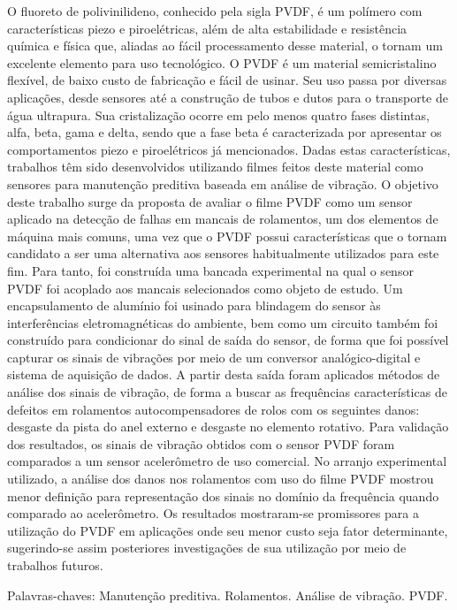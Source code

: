 \documentclass[
	12pt,				
	oneside,			
	a4paper,			
	english,			
	brazil,			
	]{abntex2ppgsi}
\begin{document}
\begin{resumo}
O fluoreto de polivinilideno, conhecido pela sigla PVDF, é um polímero com características piezo e piroelétricas, além de alta estabilidade e resistência química e física que, aliadas ao fácil processamento desse material, o tornam um excelente elemento para uso tecnológico. O PVDF é um material semicristalino flexível, de baixo custo de fabricação e fácil de usinar. Seu uso passa por diversas aplicações, desde sensores até a construção de tubos e dutos para o transporte de água ultrapura. Sua cristalização ocorre em pelo menos quatro fases distintas, alfa, beta, gama e delta, sendo que a fase beta é caracterizada por apresentar os comportamentos piezo e piroelétricos já mencionados. Dadas estas características, trabalhos têm sido desenvolvidos utilizando filmes feitos deste material como sensores para manutenção preditiva baseada em análise de vibração. O objetivo deste trabalho surge da proposta de avaliar o filme PVDF como um sensor aplicado na detecção de falhas em mancais de rolamentos, um dos elementos de máquina mais comuns, uma vez que o PVDF possui características que o tornam candidato a ser uma alternativa aos sensores habitualmente utilizados para este fim. Para tanto, foi construída uma bancada experimental na qual o sensor PVDF foi acoplado aos mancais selecionados como objeto de estudo. Um encapsulamento de alumínio foi usinado para blindagem do sensor às interferências eletromagnéticas do ambiente, bem como um circuito também foi construído para condicionar do sinal de saída do sensor, de forma que foi possível capturar os sinais de vibrações por meio de um conversor analógico-digital e sistema de aquisição de dados. A partir desta saída foram aplicados métodos de análise dos sinais de vibração, de forma a buscar as frequências características de defeitos em rolamentos autocompensadores de rolos com os seguintes danos: desgaste da pista do anel externo e desgaste no elemento rotativo. Para validação dos resultados, os sinais de vibração obtidos com o sensor PVDF foram comparados a um sensor acelerômetro de uso comercial. No arranjo experimental utilizado, a análise dos danos nos rolamentos com uso do filme PVDF mostrou menor definição para representação dos sinais no domínio da frequência quando comparado ao acelerômetro. Os resultados mostraram-se promissores para a utilização do PVDF em aplicações onde seu menor custo seja fator determinante, sugerindo-se assim posteriores investigações de sua utilização por meio de trabalhos futuros. 

Palavras-chaves: Manutenção preditiva. Rolamentos. Análise de vibração. PVDF.
\end{resumo}
\end{document}
